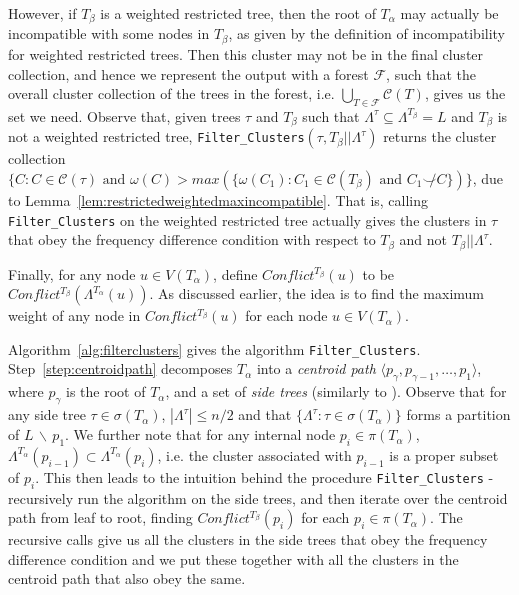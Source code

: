 \documentclass[final,1p,times]{elsarticle}
\newcommand{\compatible}{\smile}
\newcommand{\leafset}{\Lambda}
\newcommand{\weight}{\omega}
\newcommand{\TA}{T_\alpha}
\newcommand{\TB}{T_\beta}
\begin{document}
    However, if $\TB$ is a weighted restricted tree, then the root of $\TA$ may actually be incompatible with some nodes in $\TB$, as given by the definition of incompatibility for weighted restricted trees. Then this cluster may not be in the final cluster collection, and hence we represent the output with a forest $\mathcal{F}$, such that the overall cluster collection of the trees in the forest, i.e. $\bigcup_{T \in \mathcal{F}} \mathcal{C}(T)$, gives us the set we need. Observe that, given trees $\tau$ and $\TB$ such that $\leafset^{\tau} \subseteq \leafset^{\TB} = L$ and $\TB$ is not a weighted restricted tree, \texttt{Filter\_Clusters}$(\tau, \TB||\leafset^{\tau})$ returns the cluster collection $\{C : C \in \mathcal{C}(\tau) \text{ and } \weight(C) > max(\{\weight(C_1) : C_1 \in \mathcal{C}(\TB) \text{ and } C_1 \not\compatible C\})\}$, due to Lemma~\ref{lem:restrictedweightedmaxincompatible}. That is, calling \texttt{Filter\_Clusters} on the weighted restricted tree actually gives the clusters in $\tau$ that obey the frequency difference condition with respect to $\TB$ and not $\TB||\leafset^{\tau}$.

    Finally, for any node $u \in V(\TA)$, define $Conflict^{\TB}(u)$ to be $Conflict^{\TB}(\leafset^{\TA}(u))$. As discussed earlier, the idea is to find the maximum weight of any node in $Conflict^{\TB}(u)$ for each node $u \in V(\TA)$.

    Algorithm~\ref{alg:filterclusters} gives the algorithm \texttt{Filter\_Clusters}. Step~\ref{step:centroidpath} decomposes $\TA$ into a \textit{centroid path} $\langle p_{\gamma}, p_{\gamma - 1}, \dots, p_1 \rangle$, where $p_{\gamma}$ is the root of $\TA$, and a set of \textit{side trees} (similarly to \cite{jansson2018algorithms}). Observe that for any side tree $\tau \in \sigma(\TA)$, $|\leafset^\tau| \leq n/2$ and that $\{\leafset^{\tau} : \tau \in \sigma(\TA)\}$ forms a partition of $L\, \backslash\, {p_1}$. We further note that for any internal node $p_i \in \pi(\TA)$, $\leafset^{\TA}(p_{i - 1}) \subset \leafset^{\TA}(p_i)$, i.e. the cluster associated with $p_{i-1}$ is a proper subset of $p_i$. This then leads to the intuition behind the procedure \texttt{Filter\_Clusters} - recursively run the algorithm on the side trees, and then iterate over the centroid path from leaf to root, finding $Conflict^{\TB}(p_i)$ for each $p_i \in \pi(\TA)$. The recursive calls give us all the clusters in the side trees that obey the frequency difference condition and we put these together with all the clusters in the centroid path that also obey the same.
\end{document}
